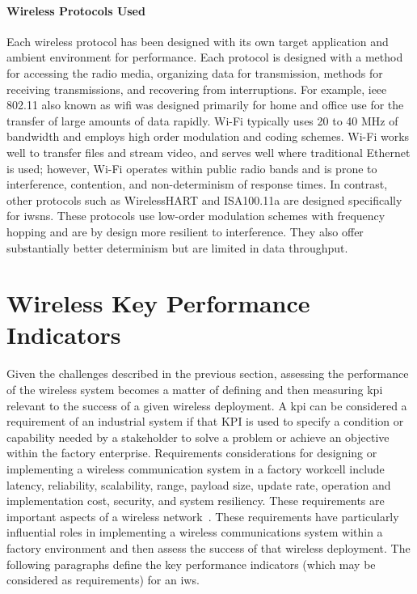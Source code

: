 \paragraph{Wireless Protocols Used} Each wireless protocol has been designed with its own target application and ambient environment for performance.  Each protocol is designed with a method for accessing the radio media, organizing data for transmission, methods for receiving transmissions, and recovering from interruptions.   For example, \gls{ieee} 802.11 also known as \gls{wifi} was designed primarily for home and office use for the transfer of large amounts of data rapidly.  Wi-Fi typically uses 20 to 40 MHz of bandwidth and employs high order modulation and coding schemes.  Wi-Fi works well to transfer files and stream video, and serves well where traditional Ethernet is used; however, Wi-Fi operates within public radio bands and is prone to interference, contention, and non-determinism of response times.  In contrast, other protocols such as WirelessHART and ISA100.11a are designed specifically for \glspl{iwsn}.  These protocols use low-order modulation schemes with frequency hopping and are by design more resilient to interference.  They also offer substantially better determinism but are limited in data throughput.

\section{Wireless Key Performance Indicators}

Given the challenges described in the previous section, assessing the performance of the wireless system becomes a matter of defining and then measuring \gls{kpi} relevant to the success of a given wireless deployment.  A \gls{kpi} can be considered a requirement of an industrial system if that KPI is used to specify a condition or capability needed by a stakeholder to solve a problem or achieve an objective within the factory enterprise.  Requirements considerations for designing or implementing a wireless communication system in a factory workcell include latency, reliability, scalability, range, payload size, update rate, operation and implementation cost, security, and system resiliency. These requirements are important aspects of a wireless network~\cite{CandellRW2017}. These requirements have particularly influential roles in implementing a wireless communications system within a factory environment and then assess the success of that wireless deployment.  The following paragraphs define the key performance indicators (which may be considered as requirements) for an \gls{iws}. 


